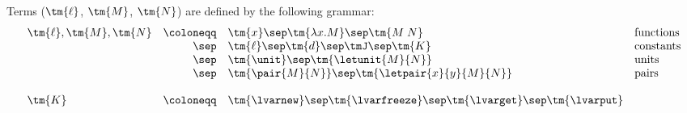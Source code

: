 Terms ($\tm{\ell}$, $\tm{M}$, $\tm{N}$) are defined by the following grammar:
\[
  \begin{array}{lrll}
  \tm{\ell}, \tm{M}, \tm{N}
  & \coloneqq & \tm{x}
    \sep        \tm{\lambda x.M}
    \sep        \tm{M\;N}                     & \text{functions} \\
  & \sep      & \tm{\ell}
    \sep        \tm{d}
    \sep        \tmJ
    \sep        \tm{K}                        & \text{constants} \\
  & \sep      & \tm{\unit}
    \sep        \tm{\letunit{M}{N}}           & \text{units} \\
  & \sep      & \tm{\pair{M}{N}}
    \sep        \tm{\letpair{x}{y}{M}{N}}     & \text{pairs}
  \\
  \\
  \tm{K}
  & \coloneqq & \tm{\lvarnew}
    \sep        \tm{\lvarfreeze}
    \sep        \tm{\lvarget}
    \sep        \tm{\lvarput}
\end{array}
\]
